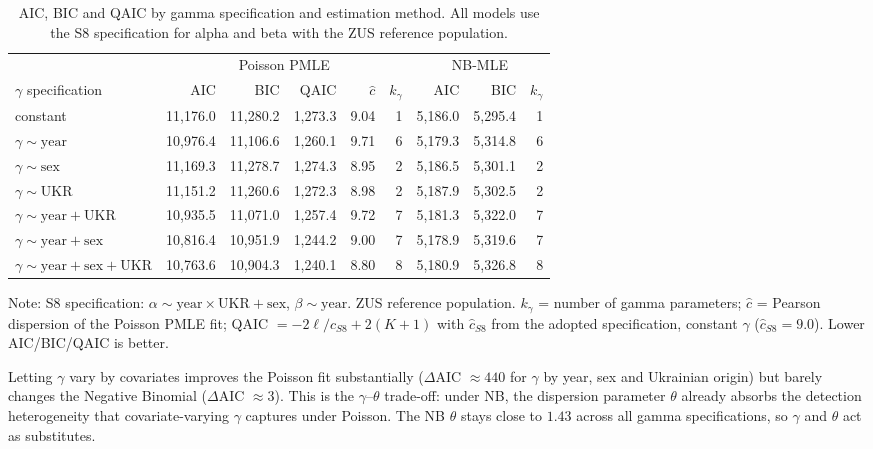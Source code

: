 \begin{table}[ht!]
\caption{\label{tbl-cov-gamma-aic}AIC, BIC and QAIC by gamma specification and estimation method. All models use the S8 specification for alpha and beta with the ZUS reference population.} 
\fontsize{8.0pt}{10.0pt}\selectfont
\begin{tabular*}{\linewidth}{@{\extracolsep{\fill}}lrrrrrrrr}
\toprule
 & \multicolumn{5}{c}{{Poisson PMLE}} & \multicolumn{3}{c}{{NB-MLE}} \\ 
\cmidrule(lr){2-6} \cmidrule(lr){7-9}
$\gamma$ specification & AIC & BIC & QAIC & $\hat c$ & $k_\gamma$ & AIC & BIC & $k_\gamma$ \\ 
\midrule\addlinespace[2.5pt]
constant & 11,176.0 & 11,280.2 & 1,273.3 & 9.04 & 1 & 5,186.0 & 5,295.4 & 1 \\ 
$\gamma \sim \text{year}$ & 10,976.4 & 11,106.6 & 1,260.1 & 9.71 & 6 & 5,179.3 & 5,314.8 & 6 \\ 
$\gamma \sim \text{sex}$ & 11,169.3 & 11,278.7 & 1,274.3 & 8.95 & 2 & 5,186.5 & 5,301.1 & 2 \\ 
$\gamma \sim \text{UKR}$ & 11,151.2 & 11,260.6 & 1,272.3 & 8.98 & 2 & 5,187.9 & 5,302.5 & 2 \\ 
$\gamma \sim \text{year} + \text{UKR}$ & 10,935.5 & 11,071.0 & 1,257.4 & 9.72 & 7 & 5,181.3 & 5,322.0 & 7 \\ 
$\gamma \sim \text{year} + \text{sex}$ & 10,816.4 & 10,951.9 & 1,244.2 & 9.00 & 7 & 5,178.9 & 5,319.6 & 7 \\ 
$\gamma \sim \text{year} + \text{sex} + \text{UKR}$ & 10,763.6 & 10,904.3 & 1,240.1 & 8.80 & 8 & 5,180.9 & 5,326.8 & 8 \\ 
\bottomrule
\end{tabular*}
\begin{minipage}{\linewidth}
\vspace{.05em}
Note: S8 specification: $\alpha \sim \text{year} \times \text{UKR} + \text{sex}$, $\beta \sim \text{year}$. ZUS reference population. $k_\gamma$ = number of gamma parameters; $\hat c$ = Pearson dispersion of the Poisson PMLE fit; QAIC $= -2\ell/\hat c_{S8} + 2(K+1)$ with $\hat c_{S8}$ from the adopted specification, constant $\gamma$ ($\hat c_{S8} = 9.0$). Lower AIC/BIC/QAIC is better.\\
\end{minipage}
\end{table}

Letting $\gamma$ vary by covariates improves the Poisson fit
substantially ($\Delta$AIC $\approx 440$ for $\gamma$ by year, sex
and Ukrainian origin) but barely changes the Negative Binomial
($\Delta$AIC $\approx 3$). This is the $\gamma$--$\theta$
trade-off: under NB, the dispersion parameter $\theta$ already absorbs
the detection heterogeneity that covariate-varying $\gamma$ captures
under Poisson. The NB $\theta$ stays close to $1.43$ across all gamma
specifications, so $\gamma$ and $\theta$ act as substitutes.

